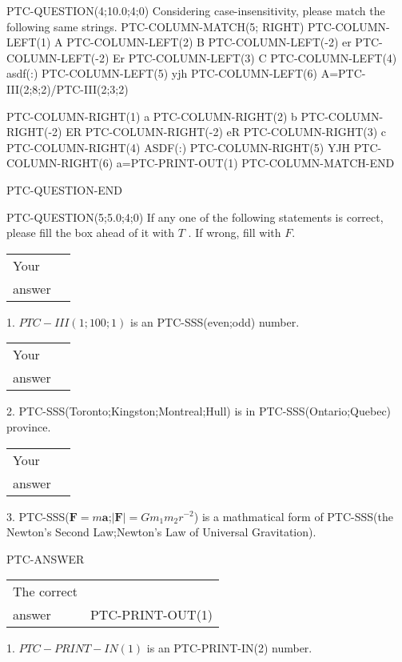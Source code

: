 \documentclass[12pt]{article}
\begin{document}
PTC-QUESTION(4;10.0;4;0)
Considering case-insensitivity, please match the following same strings.
PTC-COLUMN-MATCH(5; RIGHT)
PTC-COLUMN-LEFT(1) A
PTC-COLUMN-LEFT(2) B
PTC-COLUMN-LEFT(-2) er
PTC-COLUMN-LEFT(-2) Er
PTC-COLUMN-LEFT(3) C
PTC-COLUMN-LEFT(4) asdf(:)
PTC-COLUMN-LEFT(5) yjh
PTC-COLUMN-LEFT(6) A=PTC-III(2;8;2)/PTC-III(2;3;2)

PTC-COLUMN-RIGHT(1) a
PTC-COLUMN-RIGHT(2) b
PTC-COLUMN-RIGHT(-2) ER
PTC-COLUMN-RIGHT(-2) eR
PTC-COLUMN-RIGHT(3) c
PTC-COLUMN-RIGHT(4) ASDF(:)
PTC-COLUMN-RIGHT(5) YJH
PTC-COLUMN-RIGHT(6) a=PTC-PRINT-OUT(1)
PTC-COLUMN-MATCH-END

PTC-QUESTION-END


PTC-QUESTION(5;5.0;4;0)
If any one of the following statements is correct, please fill the box ahead of it with $T$ .
If wrong, fill with $F$.

\noindent\begin{tabular}{|l|l|}\hline Your&\hspace{.2in} \\ answer&\hspace{.2in} \\ \hline \end{tabular}
1. $PTC-III(1;100;1)$ is an PTC-SSS(even;odd) number.

\noindent\begin{tabular}{|l|l|}\hline Your&\hspace{.2in} \\ answer&\hspace{.2in} \\ \hline \end{tabular}
2. PTC-SSS(Toronto;Kingston;Montreal;Hull) is in PTC-SSS(Ontario;Quebec) province.

\noindent\begin{tabular}{|l|l|}\hline Your&\hspace{.2in} \\ answer&\hspace{.2in} \\ \hline \end{tabular}
3. PTC-SSS($\mathbf{F}=m\mathbf{a}$;$\left| \mathbf{F}\right| =Gm_1m_2r^{-2}$) is a mathmatical form of
PTC-SSS(the Newton's Second Law;Newton's Law of Universal Gravitation).

PTC-ANSWER

\noindent\begin{tabular}{|l|l|}\hline The correct & \\
          answer & PTC-PRINT-OUT(1) \\ \hline \end{tabular}
1. $PTC-PRINT-IN(1)$ is an PTC-PRINT-IN(2) number.
\end{document}
